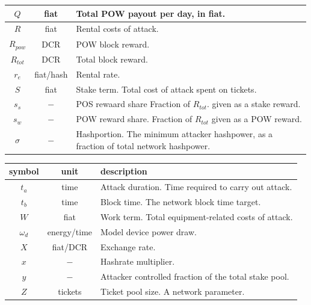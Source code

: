 \documentclass[a4paper,12pt]{article}
\begin{document}
\begin{appendices}
\begin{center}
\begin{tabular}{ | c | c | l | }
	$ Q $ & fiat & Total POW payout per day, in fiat. \\ \hline
	$ R $ & fiat & Rental costs of attack. \\ \hline
	$ R_{pow} $ & DCR & POW block reward. \\ \hline
	$ R_{tot} $ & DCR & Total block reward. \\ \hline
	$ r_e $ & fiat/hash & Rental rate. \\ \hline
	$ S $ & fiat & Stake term. Total cost of attack spent on tickets. \\ \hline
	$ s_s $ & $ - $ & \makecell[l]{POS rewaard share Fraction of $R_{tot}$. given as a \\stake reward. }\\ \hline
	$ s_w $ & $ - $ & \makecell[l]{ POW reward share. Fraction of $R_{tot} $ given as a \\POW reward. }\\ \hline
	$ \sigma $ & $ - $ & \makecell[l]{ Hashportion. The minimum attacker hashpower, as a \\fraction of total network hashpower.} \\ \hline
  \end{tabular}
\end{center}	

\begin{center}
\small
  \begin{tabular}{ | c | c | l | }
    \hline
	\textbf{ symbol } & \textbf{ unit } & \textbf{ description } \\ \hline
	$ t_a $ & time & Attack duration. Time required to carry out attack. \\ \hline
	$ t_b $ & time & Block time. The network block time target. \\ \hline
	$ W $ & fiat & Work term. Total equipment-related costs of attack. \\ \hline
	$ \omega_d $ & energy/time & Model device power draw. \\ \hline
	$ X $ & fiat/DCR & Exchange rate. \\ \hline
	$ x $ & $ - $ & Hashrate multiplier. \\ \hline
	$ y $ & $ - $ & Attacker controlled fraction of the total stake pool. \\ \hline
	$ Z $ & tickets & Ticket pool size. A network parameter. \\ \hline
  \end{tabular}
\end{center}




\end{appendices}
\end{document}
